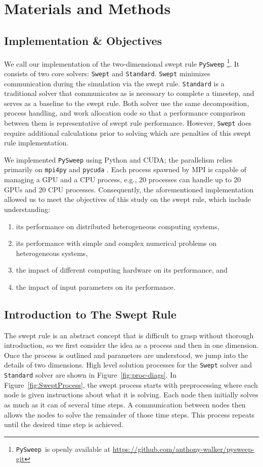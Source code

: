 \documentclass[mca,article,submit,moreauthors,pdftex]{Definitions/mdpi}
\def\github{\url{https://github.com/anthony-walker/pysweep-git}}
\def\pysweep{\texttt{PySweep}}
\def\Swept{\texttt{Swept}}
\def\Standard{\texttt{Standard}}
\begin{document}
\section{Materials and Methods}
\label{methods-section}

\subsection{Implementation \& Objectives}

We call our implementation of the two-dimensional swept rule \pysweep{} \footnote{\pysweep~is openly available at \github}. It consists of two core solvers: \Swept{} and \Standard{}. \Swept{} minimizes communication during the simulation via the swept rule. \Standard{} is a traditional solver that communicates as is necessary to complete a timestep, and serves as a baseline to the swept rule. Both solver use the same decomposition, process handling, and work allocation code so that a performance comparison between them is representative of swept rule performance. However, \Swept{} does require additional calculations prior to solving which are penalties of this swept rule implementation. 

We implemented \pysweep{} using Python and CUDA; the parallelism relies primarily on \texttt{mpi4py} \cite{dalcin_mpi_2005} and \texttt{pycuda} \cite{klockner_pycuda_2012}. Each process spawned by MPI is capable of managing a GPU and a CPU process, e.g., 20 processes can handle up to 20 GPUs and 20 CPU processes. Consequently, the aforementioned implementation allowed us to meet the objectives of this study on the swept rule, which include understanding:
\begin{enumerate}
    \item its performance on distributed heterogeneous computing systems,
    \item its performance with simple and complex numerical problems on heterogeneous systems,
    \item the impact of different computing hardware on its performance, and
    \item the impact of input parameters on its performance.
\end{enumerate}

\subsection{Introduction to The Swept Rule}
\label{swept-intro}
The swept rule is an abstract concept that is difficult to grasp without thorough introduction, so we first consider the idea as a process and then in one dimension. Once the process is outlined and parameters are understood, we jump into the details of two dimensions. High level solution processes for the \Swept{} solver and \Standard{} solver are shown in  Figure~\ref{fig:proc-diags}. In Figure~\ref{fig:SweptProcess}, the swept process starts with preprocessing where each node is given instructions about what it is solving. Each node then initially solves as much as it can of several time steps. A communication between nodes then allows the nodes to solve the remainder of those time steps. This process repeats until the desired time step is achieved. 
\end{document}
